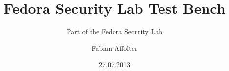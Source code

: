 \documentclass[12pt]{beamer}
\title[FSL Test Bench]{Fedora Security Lab Test Bench}
\subtitle{Part of the Fedora Security Lab}
\author{Fabian Affolter}
\institute[Fedora Project]
{
\medskip
{\emph{\href{mailto:fab@fedoraproject.org}{fab@fedoraproject.org}}}
}
\date{27.07.2013}
\begin{document}
%
\begin{frame}
\titlepage
\end{frame}
%
\begin{frame}
\frametitle{\\}
\tableofcontents
\end{frame}
%








%
\end{document}
